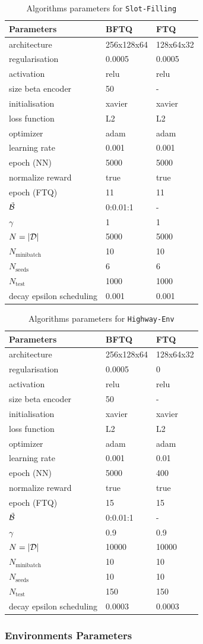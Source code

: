 \begin{subappendices}
\begin{table}[tp]
	\centering
	\begin{tabular}{lll}
		\toprule
		Parameters & BFTQ & FTQ\tabularnewline
		\midrule
		architecture & 256x128x64 & 128x64x32\tabularnewline
		regularisation & 0.0005 & 0.0005\tabularnewline
		activation & relu & relu\tabularnewline
		size beta encoder & 50 & -\tabularnewline
		initialisation & xavier & xavier\tabularnewline
		loss function & L2 & L2\tabularnewline
		optimizer & adam & adam\tabularnewline
		learning rate & 0.001 & 0.001\tabularnewline
		epoch (NN) & 5000 & 5000\tabularnewline
		normalize reward & true & true\tabularnewline
		epoch (FTQ) & 11 & 11\tabularnewline
		$\tilde{\mathcal{B}}$ & 0:0.01:1 & -\tabularnewline
		$\gamma$ & 1 & 1\tabularnewline
		$N=|\mathcal{D}|$ & 5000 & 5000\tabularnewline
		$N_\text{minibatch}$ & 10 & 10\tabularnewline
		$N_\text{seeds}$ & 6 & 6\tabularnewline
		$N_\text{test}$ & 1000 & 1000\tabularnewline
		decay epsilon scheduling & 0.001 & 0.001\tabularnewline
		\bottomrule
	\end{tabular}
	\caption{Algorithms parameters for \texttt{Slot-Filling}}
	\label{tab:param-algo-slot-filling}
\end{table}
\begin{table}[tp]
	\centering
	\begin{tabular}{lll}
		\toprule
		Parameters & BFTQ & FTQ\tabularnewline
		\midrule
		architecture & 256x128x64 & 128x64x32\tabularnewline
		regularisation & 0.0005 & 0\tabularnewline
		activation & relu & relu\tabularnewline
		size beta encoder & 50 & -\tabularnewline
		initialisation & xavier & xavier\tabularnewline
		loss function & L2 & L2\tabularnewline
		optimizer & adam & adam\tabularnewline
		learning rate & 0.001 & 0.01\tabularnewline
		epoch (NN) & 5000 & 400\tabularnewline
		normalize reward & true & true\tabularnewline
		epoch (FTQ) & 15 & 15\tabularnewline
		$\tilde{\mathcal{B}}$ & 0:0.01:1 & -\tabularnewline
		$\gamma$ & 0.9 & 0.9\tabularnewline
		$N=|\mathcal{D}|$ & 10000 & 10000\tabularnewline
		$N_\text{minibatch}$ & 10 & 10\tabularnewline
		$N_\text{seeds}$ & 10 & 10\tabularnewline
		$N_\text{test}$ & 150 & 150\tabularnewline
		decay epsilon scheduling & 0.0003 & 0.0003\tabularnewline
		\bottomrule
	\end{tabular}
	\caption{Algorithms parameters for \texttt{Highway-Env}}
	\label{tab:param-algo-highway-env}
\end{table}

\subsubsection{Environments Parameters}
\label{sec:env-parameters}


\end{subappendices}
